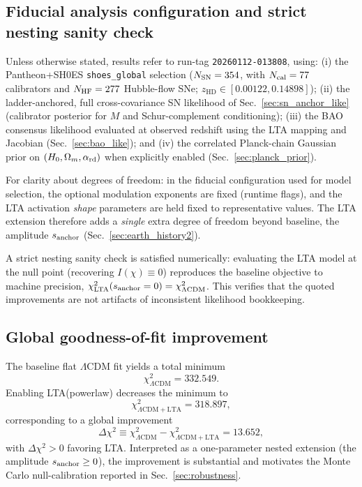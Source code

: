 \documentclass[10pt]{article}
\newcommand{\zhd}{z_{\mathrm{HD}}}
\newcommand{\chis}{\chi}
\newcommand{\Iofchi}{I(\chis)}
\begin{document}
\subsection{Fiducial analysis configuration and strict nesting sanity check}
\label{sec:results_config}

Unless otherwise stated, results refer to run-tag \texttt{20260112-013808}, using:
(i) the Pantheon+SH0ES \texttt{shoes\_global} selection (\(N_{\rm SN}=354\), with
\(N_{\rm cal}=77\) calibrators and \(N_{\rm HF}=277\) Hubble-flow SNe; \(\zhd\in[0.00122,0.14898]\));
(ii) the ladder-anchored, full cross-covariance SN likelihood of Sec.~\ref{sec:sn_anchor_like}
(calibrator posterior for $M$ and Schur-complement conditioning);
(iii) the BAO consensus likelihood evaluated at observed redshift using the LTA mapping and Jacobian
(Sec.~\ref{sec:bao_like});
and (iv) the correlated Planck-chain Gaussian prior on \((H_0,\Omega_m,\alpha_{\rm rd})\) when
explicitly enabled (Sec.~\ref{sec:planck_prior}).

For clarity about degrees of freedom: in the fiducial configuration used for model selection,
the optional modulation exponents are fixed (runtime flags), and the LTA activation \emph{shape}
parameters are held fixed to representative values. The LTA extension therefore adds a \emph{single}
extra degree of freedom beyond baseline, the amplitude \(s_{\rm anchor}\) (Sec.~\ref{sec:earth_history2}).

A strict nesting sanity check is satisfied numerically: evaluating the LTA model at the null point
(recovering \(\Iofchi\equiv 0\)) reproduces the baseline objective to machine precision,
\(\chi^2_{\rm LTA}(s_{\rm anchor}=0)=\chi^2_{\Lambda{\rm CDM}}\).
This verifies that the quoted improvements are not artifacts of inconsistent likelihood bookkeeping.

\subsection{Global goodness-of-fit improvement}
\label{sec:results_global}

The baseline flat $\Lambda$CDM fit yields a total minimum
\begin{equation}
\chi^2_{\Lambda\mathrm{CDM}} = 332.549.
\end{equation}
Enabling LTA(powerlaw) decreases the minimum to
\begin{equation}
\chi^2_{\Lambda\mathrm{CDM+LTA}} = 318.897,
\end{equation}
corresponding to a global improvement
\begin{equation}
\Delta\chi^2 \equiv \chi^2_{\Lambda\mathrm{CDM}}-\chi^2_{\Lambda\mathrm{CDM+LTA}}
= 13.652,
\end{equation}
with \(\Delta\chi^2>0\) favoring LTA. Interpreted as a one-parameter nested extension (the amplitude
\(s_{\rm anchor}\ge 0\)), the improvement is substantial and motivates the Monte Carlo
null-calibration reported in Sec.~\ref{sec:robustness}.
\end{document}

